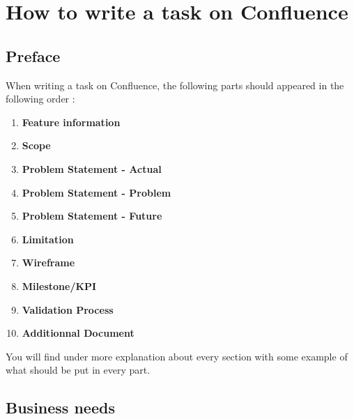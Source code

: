 \documentclass[a4paper,article,oneside]{memoir}
\begin{document}
\tableofcontents
\part{How to write a task on Confluence}
	\chapter*{Preface}
		When writing a task on Confluence, the following parts should appeared in the following order :
	
        \begin{enumerate}
  			\item {\color{BrickRed}\textbf{Feature information}}
  			\item {\color{BrickRed}\textbf{Scope}}
  			\item {\color{BrickRed}\textbf{Problem Statement - Actual}}	\item {\color{BrickRed}\textbf{Problem Statement - Problem}}	\item {\color{BrickRed}\textbf{Problem Statement - Future}}
  			\item {\color{BrickRed}\textbf{Limitation}}
  			\item {\color{BrickRed}\textbf{Wireframe}}
  			\item {\color{BrickRed}\textbf{Milestone/KPI}}
  			\item {\color{BrickRed}\textbf{Validation Process}}
  			\item {\color{BrickRed}\textbf{Additionnal Document}}
		\end{enumerate}
		
	You will find under more explanation about every section with some example of what should be put in every part.
    \chapter{Business needs}
\end{document}
